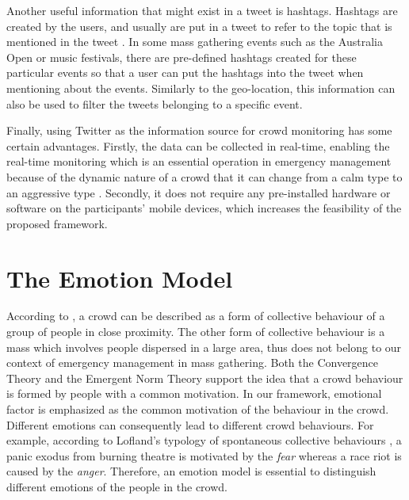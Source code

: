 Another useful information that might exist in a tweet is hashtags. Hashtags are created by the users, and usually are put in a tweet to refer to the topic that is mentioned in the tweet \citep{mohammad2014using}. In some mass gathering events such as the Australia Open or music festivals, there are pre-defined hashtags created for these particular events so that a user can put the hashtags into the tweet when mentioning about the events. Similarly to the geo-location, this information can also be used to filter the tweets belonging to a specific event.

Finally, using Twitter as the information source for crowd monitoring has some certain advantages. Firstly, the data can be collected in real-time, enabling the real-time monitoring which is an essential operation in emergency management because of the dynamic nature of a crowd that it can change from a calm type to an aggressive type \citep{Berlonghi1995}. Secondly, it does not require any pre-installed hardware or software on the participants' mobile devices, which increases the feasibility of the proposed framework.

\section{The Emotion Model}

According to \citet{Kornblum2011}, a crowd can be described as a form of collective behaviour of a group of people in close proximity. The other form of collective behaviour is a mass which involves people dispersed in a large area, thus does not belong to our context of emergency management in mass gathering. Both the Convergence Theory and the Emergent Norm Theory \citep{mcphail1991myth} support the idea that a crowd behaviour is formed by people with a common motivation. In our framework, emotional factor is emphasized as the common motivation of the behaviour in the crowd. Different emotions can consequently lead to different crowd behaviours. For example, according to Lofland's typology of spontaneous collective behaviours \citep{Kornblum2011}, a panic exodus from burning theatre is motivated by the \textit{fear} whereas a race riot is caused by the \textit{anger}. Therefore, an emotion model is essential to distinguish different emotions of the people in the crowd.

